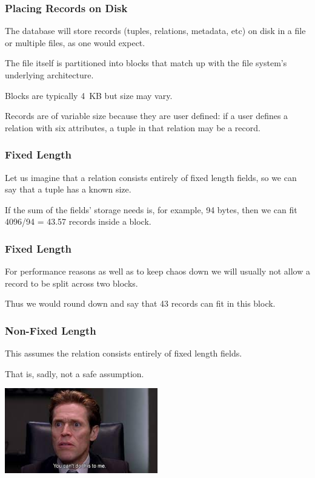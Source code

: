 \begin{frame}
\frametitle{Placing Records on Disk}

The database will store records (tuples, relations, metadata, etc) on disk in a file or multiple files, as one would expect. 

The file itself is partitioned into blocks that match up with the file system's underlying architecture. 

Blocks are typically 4~KB but size may vary. 

Records are of variable size because they are user defined: if a user defines a relation with six attributes, a tuple in that relation may be a record.

\end{frame}



\begin{frame}
\frametitle{Fixed Length}

Let us imagine that a relation consists entirely of fixed length fields, so we can say that a tuple has a known size. 

If the sum of the fields' storage needs is, for example, 94 bytes, then we can fit 4096/94 = 43.57 records inside a block. 

\end{frame}



\begin{frame}
\frametitle{Fixed Length}


For performance reasons as well as to keep chaos down we will usually not allow a record to be split across two blocks. 

Thus we would round down and say that 43 records can fit in this block.

\end{frame}



\begin{frame}
\frametitle{Non-Fixed Length}

This assumes the relation consists entirely of fixed length fields. 

That is, sadly, not a safe assumption.

\begin{center}
	\includegraphics[width=0.5\textwidth]{images/willem.jpg}
\end{center}

\end{frame}



